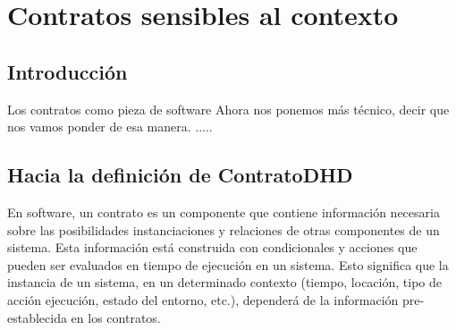 \chapter{Contratos sensibles al contexto}\label{cap:contratos} \label{cap:5}


\section {Introducción}

Los contratos como pieza de software 
Ahora nos ponemos más técnico, decir que nos vamos ponder de esa manera.
.....

\section{Hacia la definición de ContratoDHD}

En software, un contrato es un componente que contiene información necesaria sobre las posibilidades instanciaciones y relaciones de otras componentes de un sistema. Esta información está construida con condicionales y acciones que pueden ser evaluados en tiempo de ejecución en un sistema. Esto significa que la instancia de un sistema, en un determinado contexto (tiempo, locación, tipo de acción ejecución, estado del entorno, etc.), dependerá de la información pre-establecida en los contratos. 


